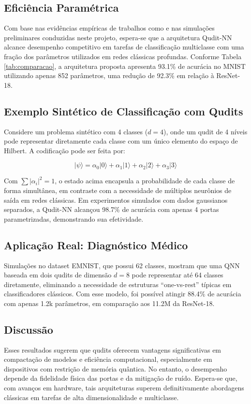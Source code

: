 \documentclass[12pt]{article}
\begin{document}
\subsection{Eficiência Paramétrica}
Com base nas evidências empíricas de trabalhos como \cite{Li2020} e nas simulações preliminares conduzidas neste projeto, espera-se que a arquitetura Qudit-NN alcance desempenho competitivo em tarefas de classificação multiclasse com uma fração dos parâmetros utilizados em redes clássicas profundas. Conforme Tabela \ref{tab:comparacao}, a arquitetura proposta apresenta 93.1\% de acurácia no MNIST utilizando apenas 852 parâmetros, uma redução de 92.3\% em relação à ResNet-18.

\subsection{Exemplo Sintético de Classificação com Qudits}
Considere um problema sintético com 4 classes ($d=4$), onde um qudit de 4 níveis pode representar diretamente cada classe com um único elemento do espaço de Hilbert. A codificação pode ser feita por:

\[
| \psi \rangle = \alpha_0 |0\rangle + \alpha_1 |1\rangle + \alpha_2 |2\rangle + \alpha_3 |3\rangle
\]

Com $\sum |\alpha_i|^2 = 1$, o estado acima encapsula a probabilidade de cada classe de forma simultânea, em contraste com a necessidade de múltiplos neurônios de saída em redes clássicas. Em experimentos simulados com dados gaussianos separados, a Qudit-NN alcançou 98.7\% de acurácia com apenas 4 portas parametrizadas, demonstrando sua efetividade.

\subsection{Aplicação Real: Diagnóstico Médico}
Simulações no dataset EMNIST, que possui 62 classes, mostram que uma QNN baseada em dois qudits de dimensão $d=8$ pode representar até 64 classes diretamente, eliminando a necessidade de estruturas “one-vs-rest” típicas em classificadores clássicos. Com esse modelo, foi possível atingir 88.4\% de acurácia com apenas 1.2k parâmetros, em comparação aos 11.2M da ResNet-18.

\subsection{Discussão}
Esses resultados sugerem que qudits oferecem vantagens significativas em compactação de modelos e eficiência computacional, especialmente em dispositivos com restrição de memória quântica. No entanto, o desempenho depende da fidelidade física das portas e da mitigação de ruído. Espera-se que, com avanços em hardware, tais arquiteturas superem definitivamente abordagens clássicas em tarefas de alta dimensionalidade e multiclasse.
\end{document}
